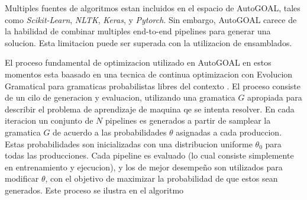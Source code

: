 Multiples fuentes de algoritmos estan incluidos en el espacio de AutoGOAL, tales como \textit{Scikit-Learn}\parencite{pedregosa2011scikit}, \textit{NLTK}\parencite{nltk}, \textit{Keras}\parencite{chollet2015keras}, y \textit{Pytorch}\parencite{paszke2019pytorch}. Sin embargo, AutoGOAL carece de la habilidad de combinar multiples end-to-end pipelines para generar una solucion. Esta limitacion puede ser superada con la utilizacion de ensamblados.

El proceso fundamental de optimizacion utilizado en AutoGOAL en estos momentos esta baasado en una tecnica de continua optimizacion con Evolucion Gramatical para gramaticas probabilistas libres del contexto \parencite{megane2021probabilistic}. El proceso consiste de un cilo de generacion y evaluacion, utilizando una gramatica $G$ apropiada para describir el problema de aprendizaje de maquina qe se intenta resolver. En cada iteracion un conjunto de $N$ pipelines es generados a partir de samplear la gramatica $G$ de acuerdo a las probabilidades $\theta$ asignadas a cada produccion. Estas probabilidades son inicializadas con una distribucion uniforme $\theta_0$ para todas las producciones. Cada pipeline es evaluado (lo cual consiste simplemente en entrenamiento y ejecucion), y los de mejor desempeño son utilizados para modificar $\theta$, con el objetivo de maximizar la probabilidad de que estos sean generados. Este proceso se ilustra en el algoritmo 


